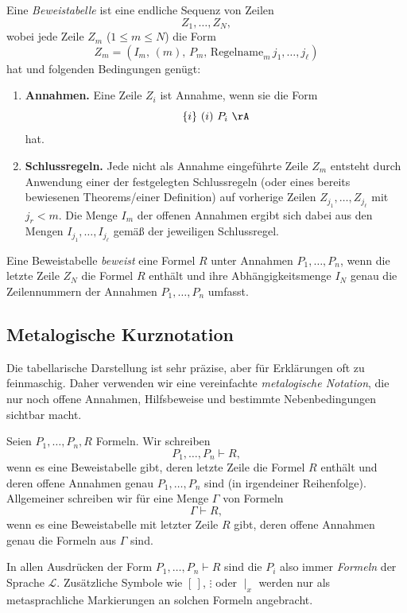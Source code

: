 \documentclass[main.tex]{subfiles}
\begin{document}
\begin{definition}[Beweistabelle]
Eine \emph{Beweistabelle} ist eine endliche Sequenz von Zeilen
\[
  Z_1,\dots,Z_N,
\]
wobei jede Zeile \(Z_m\) (\(1 \le m \le N\)) die Form
\[
  Z_m = (I_m,\,(m),\,P_m,\,\text{Regelname}_m\,j_1,\dots,j_\ell)
\]
hat und folgenden Bedingungen genügt:
\begin{enumerate}
  \item \textbf{Annahmen.} Eine Zeile \(Z_i\) ist Annahme, wenn sie die Form
    \[
      \{i\}\ (i)\ P_i\ \rA
    \]
    \label{rule:A}
    hat.
  \item \textbf{Schlussregeln.} Jede nicht als Annahme eingeführte Zeile
    \(Z_m\) entsteht durch Anwendung einer der festgelegten Schlussregeln
    (oder eines bereits bewiesenen Theorems/einer Definition) auf vorherige
    Zeilen \(Z_{j_1},\dots,Z_{j_\ell}\) mit \(j_r < m\). Die Menge \(I_m\) der
    offenen Annahmen ergibt sich dabei aus den Mengen \(I_{j_1},\dots,I_{j_\ell}\)
    gemäß der jeweiligen Schlussregel.
\end{enumerate}
Eine Beweistabelle \emph{beweist} eine Formel \(R\) unter Annahmen
\(P_1,\dots,P_n\), wenn die letzte Zeile \(Z_N\) die Formel \(R\) enthält
und ihre Abhängigkeitsmenge \(I_N\) genau die Zeilennummern der Annahmen
\(P_1,\dots,P_n\) umfasst.
\end{definition}

\subsection{Metalogische Kurznotation}

Die tabellarische Darstellung ist sehr präzise, aber für Erklärungen oft
zu feinmaschig. Daher verwenden wir eine vereinfachte \emph{metalogische
Notation}, die nur noch offene Annahmen, Hilfsbeweise und bestimmte
Nebenbedingungen sichtbar macht.

\begin{definition}
Seien \(P_1,\dots,P_n,R\) Formeln. Wir schreiben
\[
  P_1,\dots,P_n \vdash R,
\]
wenn es eine Beweistabelle gibt, deren letzte Zeile die Formel \(R\) enthält
und deren offene Annahmen genau \(P_1,\dots,P_n\) sind (in irgendeiner
Reihenfolge). Allgemeiner schreiben wir für eine Menge \(\Gamma\) von Formeln
\[
  \Gamma \vdash R,
\]
wenn es eine Beweistabelle mit letzter Zeile \(R\) gibt, deren offene Annahmen
genau die Formeln aus \(\Gamma\) sind.

In allen Ausdrücken der Form \(P_1,\dots,P_n \vdash R\) sind die
\(P_i\) also immer \emph{Formeln} der Sprache \(\mathcal L\). Zusätzliche
Symbole wie \([\,]\), \(\vdots\) oder \(\mid_x\) werden nur als
metasprachliche Markierungen an solchen Formeln angebracht.
\end{definition}
\end{document}

